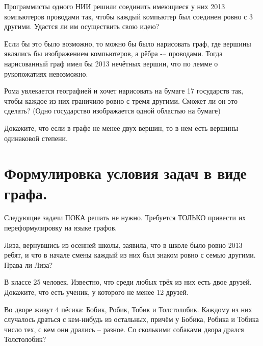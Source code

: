\begin{ex}
    Программисты одного НИИ решили соединить имеющиеся у них 2013 компьютеров проводами так, чтобы каждый компьютер был соединен ровно с 3 другими. Удастся ли им осуществить свою идею?
\end{ex}

\begin{prf}
    Если бы это было возможно, то можно бы было нарисовать граф, где вершины являлись бы изображением компьютеров, а рёбра -– проводами. Тогда нарисованный граф имел бы 2013 нечётных вершин, что по лемме о рукопожатиях невозможно.
\end{prf}

\begin{ex}
    Рома увлекается географией и хочет нарисовать на бумаге 17 государств так, чтобы каждое из них граничило ровно с тремя другими. Сможет ли он это сделать? (Одно государство изображается одной областью на бумаге)
\end{ex}

\begin{ex}
    Докажите, что если в графе не менее двух вершин, то в нем есть вершины одинаковой степени. %
\end{ex}

\section{Формулировка условия задач в виде графа.}

\noindent
Следующие задачи ПОКА решать не нужно. Требуется ТОЛЬКО привести их переформулировку на языке графов.

\begin{ex}
    Лиза, вернувшись из осенней школы, заявила, что в школе было ровно 2013 ребят, и что в начале смены каждый из них был знаком ровно с семью другими. Права ли Лиза?
\end{ex}

\begin{ex}
    В классе 25 человек. Известно, что среди любых трёх из них есть двое друзей. Докажите, что есть ученик, у которого не менее 12 друзей.
\end{ex}

\begin{ex}
    Во дворе живут 4 пёсика: Бобик, Робик, Тобик и Толстолобик. Каждому из них случалось драться с кем-нибудь из остальных, причём у Бобика, Робика и Тобика число тех, с кем они дрались -- разное. Со сколькими собаками двора дрался Толстолобик?
\end{ex}

